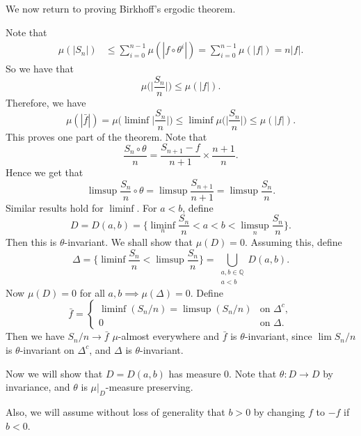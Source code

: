 \documentclass[12pt]{article}
\begin{document}

We now return to proving Birkhoff's ergodic theorem.

\begin{proofbox}
	Note that
	\begin{align*}
		\mu(|S_n|) &\leq \sum_{i = 0}^{n-1} \mu(|f \circ \theta^i|) = \sum_{i = 0}^{n-1} \mu(|f|) = n|f|.
	\end{align*}
	So we have that
	\[
	\mu\biggl( \biggl| \frac{S_n}{n} \biggr|\biggr) \leq \mu(|f|).
	\]
	Therefore, we have
	\[
	\mu(|\bar f|) = \mu \biggl( \liminf \biggl| \frac{S_n}{n} \biggr| \biggr) \leq \liminf \mu \biggl( \biggl| \frac{S_n}{n} \biggr| \biggr) \leq \mu(|f|).
	\]
	This proves one part of the theorem. Note that
	\[
	\frac{S_{n} \circ \theta}{n} = \frac{S_{n+1} - f}{n + 1} \times \frac{n+1}{n}.
	\]
	Hence we get that
	\[
	\limsup \frac{S_n}{n} \circ \theta = \limsup \frac{S_{n+1}}{n+1} = \limsup \frac{S_n}{n}.
	\]
	Similar results hold for $\liminf$.
	For $a < b$, define
	\[
		D = D(a, b) = \biggl\{ \liminf_n \frac{S_n}{n} < a < b < \limsup_n \frac{S_n}{n} \biggr\}.
	\]
	Then this is $\theta$-invariant. We shall show that $\mu(D) = 0$. Assuming this, define
	\[
		\Delta = \biggl\{ \liminf \frac{S_n}{n} < \limsup \frac{S_n}{n} \biggr\} = \bigcup_{\substack{a, b \in \mathbb{Q}\\a < b}} D(a, b).
	\]
	Now $\mu(D) = 0$ for all $a, b \implies \mu(\Delta) = 0$. Define
	\[
	\bar f =
	\begin{cases}
		\liminf(S_n/n) = \limsup(S_n/n) & \text{on } \Delta^{c},\\
		0 & \text{on } \Delta.
	\end{cases}
	\]
	Then we have $S_n/n \to \bar f$ $\mu$-almost everywhere and $\bar f$ is $\theta$-invariant, since $\lim S_n/n$ is $\theta$-invariant on $\Delta^{c}$, and $\Delta$ is $\theta$-invariant.

	Now we will show that $D = D(a, b)$ has measure 0. Note that $\theta : D \to D$ by invariance, and $\theta$ is $\mu|_D$-measure preserving.

	Also, we will assume without loss of generality that $b > 0$ by changing $f$ to $-f$ if $b < 0$.


\end{proofbox}
\end{document}
